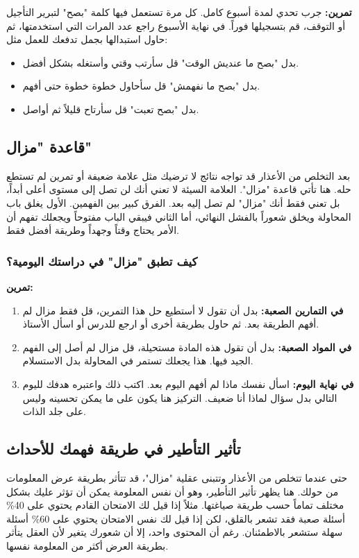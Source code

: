 \documentclass[12pt,a4paper]{book}
\newcommand{\exerciseAr}[1]{%
	\begin{exercise}
		\textbf{تمرين:} #1
	\end{exercise}
}
\begin{document}
	\exerciseAr{
		جرب تحدي لمدة أسبوع كامل. كل مرة تستعمل فيها كلمة "بصح" لتبرير التأجيل أو التوقف، قم بتسجيلها فوراً. في نهاية الأسبوع راجع عدد المرات التي استخدمتها، ثم حاول استبدالها بجمل تدفعك للعمل مثل:
		\begin{itemize}
			\item بدل "بصح ما عنديش الوقت" قل سأرتب وقتي وأستغله بشكل أفضل.
			\item بدل "بصح ما نفهمش" قل سأحاول خطوة خطوة حتى أفهم.
			\item بدل "بصح تعبت" قل سأرتاح قليلاً ثم أواصل.
		\end{itemize}
	}
	
	\subsection{قاعدة "مزال"}
	\label{sec:mazal}
	بعد التخلص من الأعذار قد تواجه نتائج لا ترضيك مثل علامة ضعيفة أو تمرين لم تستطع حله. هنا تأتي قاعدة "مزال". العلامة السيئة لا تعني أنك لن تصل إلى مستوى أعلى أبداً، بل تعني فقط أنك "مزال" لم تصل إليه بعد. الفرق كبير بين الفهمين. الأول يغلق باب المحاولة ويخلق شعوراً بالفشل النهائي، أما الثاني فيبقي الباب مفتوحاً ويجعلك تفهم أن الأمر يحتاج وقتاً وجهداً وطريقة أفضل فقط.
	
	\subsubsection*{كيف تطبق "مزال" في دراستك اليومية؟}
		\exerciseAr{
	\begin{enumerate}
		\item \textbf{في التمارين الصعبة:} بدل أن تقول لا أستطيع حل هذا التمرين، قل فقط مزال لم أفهم الطريقة بعد. ثم حاول بطريقة أخرى أو ارجع للدرس أو اسأل الأستاذ.
		
		\item \textbf{في المواد الصعبة:} بدل أن تقول هذه المادة مستحيلة، قل مزال لم أصل إلى الفهم الجيد فيها. هذا يجعلك تستمر في المحاولة بدل الاستسلام.
		
		\item \textbf{في نهاية اليوم:} اسأل نفسك ماذا لم أفهم اليوم بعد. اكتب ذلك واعتبره هدفك لليوم التالي بدل سؤال لماذا أنا ضعيف. التركيز هنا يكون على ما يمكن تحسينه وليس على جلد الذات.
	\end{enumerate}
}
	\subsection{تأثير التأطير في طريقة فهمك للأحداث}
	
	حتى عندما تتخلص من الأعذار وتتبنى عقلية "مزال"، قد تتأثر بطريقة عرض المعلومات من حولك. هنا يظهر تأثير التأطير، وهو أن نفس المعلومة يمكن أن تؤثر عليك بشكل مختلف تماماً حسب طريقة صياغتها. مثلاً إذا قيل لك الامتحان القادم يحتوي على 40\% أسئلة صعبة فقد تشعر بالقلق، لكن إذا قيل لك نفس الامتحان يحتوي على 60\% أسئلة سهلة ستشعر بالاطمئنان. رغم أن المحتوى واحد، إلا أن شعورك يتغير لأن العقل يتأثر بطريقة العرض أكثر من المعلومة نفسها.
\end{document}
